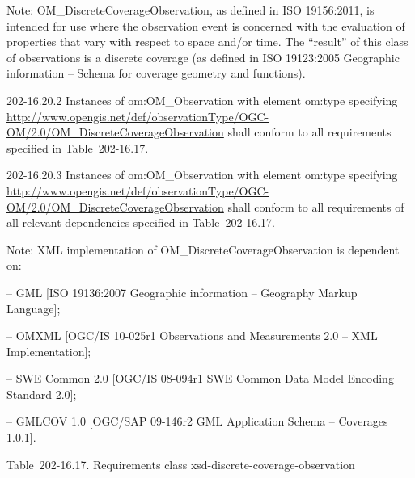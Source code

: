 Note: OM\_DiscreteCoverageObservation, as defined in ISO 19156:2011, is intended for use where the observation event is concerned with the evaluation of properties that vary with respect to space and/or time. The ``result'' of this class of observations is a discrete coverage (as defined in ISO 19123:2005 Geographic information -- Schema for coverage geometry and functions).

202-16.20.2 Instances of om:OM\_Observation with element om:type specifying \url{http://www.opengis.net/def/observationType/OGC-OM/2.0/OM_DiscreteCoverageObservation} shall conform to all requirements specified in Table~202-16.17.

202-16.20.3 Instances of om:OM\_Observation with element om:type specifying \url{http://www.opengis.net/def/observationType/OGC-OM/2.0/OM_DiscreteCoverageObservation} shall conform to all requirements of all relevant dependencies specified in Table~202-16.17.

Note: XML implementation of OM\_DiscreteCoverageObservation is dependent on:

-- GML {[}ISO 19136:2007 Geographic information -- Geography Markup Language{]};

-- OMXML {[}OGC/IS 10-025r1 Observations and Measurements 2.0 -- XML Implementation{]};

-- SWE Common 2.0 {[}OGC/IS 08-094r1 SWE Common Data Model Encoding Standard 2.0{]};

-- GMLCOV 1.0 {[}OGC/SAP 09-146r2 GML Application Schema -- Coverages 1.0.1{]}.

Table~202-16.17. Requirements class xsd-discrete-coverage-observation

